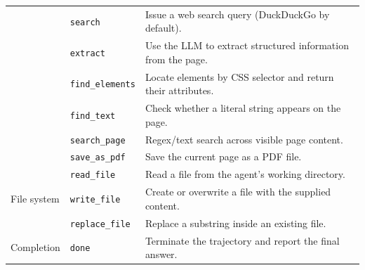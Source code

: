 \begin{table}[h]
\begin{tabular}{l l p{8cm}}
  & \texttt{search}            & Issue a web search query (DuckDuckGo by default). \\
  & \texttt{extract}           & Use the LLM to extract structured information from the page. \\
  & \texttt{find\_elements}    & Locate elements by CSS selector and return their attributes. \\
  & \texttt{find\_text}        & Check whether a literal string appears on the page. \\
  & \texttt{search\_page}      & Regex/text search across visible page content. \\
  & \texttt{save\_as\_pdf}     & Save the current page as a PDF file. \\
\midrule
\multirow{3}{*}{File system}
  & \texttt{read\_file}        & Read a file from the agent's working directory. \\
  & \texttt{write\_file}       & Create or overwrite a file with the supplied content. \\
  & \texttt{replace\_file}     & Replace a substring inside an existing file. \\
\midrule
Completion
  & \texttt{done}              & Terminate the trajectory and report the final answer. \\
\bottomrule
\end{tabular}
\end{table}
